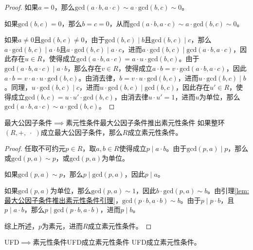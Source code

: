 \begin{proof}
	如果$a=0$，那么$\mathrm{gcd}(a\cdot b,a\cdot c)\sim a\cdot \mathrm{gcd}(b,c)\sim 0$。
	
	如果$\mathrm{gcd}(b,c)=0$，那么$b=c=0$，从而$\mathrm{gcd}(a\cdot b,a\cdot c)\sim a\cdot \mathrm{gcd}(b,c)\sim 0$。
	
	如果$a\ne 0$且$\mathrm{gcd}(b,c)\ne 0$，由于$\mathrm{gcd}(b,c)\mid b$且$\mathrm{gcd}(b,c)\mid c$，那么$a\cdot \mathrm{gcd}(b,c)\mid a\cdot b$且$a\cdot \mathrm{gcd}(b,c)\mid a\cdot c$，进而$a\cdot \mathrm{gcd}(b,c)\mid \mathrm{gcd}(a\cdot b,a\cdot c)$，因此存在$u\in R$，使得成立$\mathrm{gcd}(a\cdot b,a\cdot c)=a\cdot u\cdot \mathrm{gcd}(b,c)$。由于$\mathrm{gcd}(a\cdot b,a\cdot c)\mid a\cdot b$，那么存在$v\in R$，使得成立$a\cdot b=v\cdot \mathrm{gcd}(a\cdot b,a\cdot c)$，因此$a\cdot b=v\cdot a\cdot u\cdot \mathrm{gcd}(b,c)$。由消去律，$b=v\cdot u\cdot \mathrm{gcd}(b,c)$，进而$u\cdot \mathrm{gcd}(b,c)\mid b$。同理，$u\cdot \mathrm{gcd}(b,c)\mid c$，进而$u\cdot \mathrm{gcd}(b,c)\mid \mathrm{gcd}(b,c)$，因此存在$u'\in R$，使得成立$\mathrm{gcd}(b,c)=u\cdot u'\cdot \mathrm{gcd}(b,c)$，由消去律$u\cdot u'=1$，进而$u$为单位，那么$\mathrm{gcd}(a\cdot b,a\cdot c)\sim a\cdot \mathrm{gcd}(b,c)$。
\end{proof}

\begin{lemma}{最大公因子条件$\implies$素元性条件}{最大公因子条件推出素元性条件}
	如果整环$(R,+,\;\cdot\;)$成立最大公因子条件，那么$R$成立素元性条件。
\end{lemma}

\begin{proof}
	任取不可约元$p\in R$，取$a,b\in R$使得成立$p\mid a\cdot b$。由于$\mathrm{gcd}(p,a)\mid p$，那么或$\mathrm{gcd}(p,a)\sim p$，或$\mathrm{gcd}(p,a)$为单位。
	
	如果$\mathrm{gcd}(p,a)\sim p$，那么$p\mid \mathrm{gcd}(p,a)$，因此$p\mid a$。
	
	如果$\mathrm{gcd}(p,a)$为单位，那么$\mathrm{gcd}(p,a)\sim 1$，因此$b\cdot \mathrm{gcd}(p,a)\sim b$。由引理\ref{lem:最大公因子条件推出素元性条件引理}，$\mathrm{gcd}(p\cdot b,a\cdot b)\sim b$。由于$p\mid p\cdot b$，且$p\mid a\cdot b$，那么$p\mid \mathrm{gcd}(p\cdot b,a\cdot b)$，进而$p\mid b$。
	
	综上所述，$p$为素元，进而$R$成立素元性条件。
\end{proof}

\begin{lemma}{UFD$\implies$素元性条件}{UFD成立素元性条件}
	UFD成立素元性条件。
\end{lemma}

